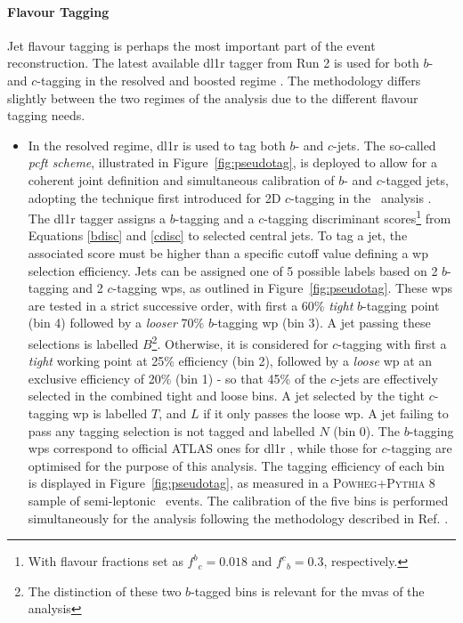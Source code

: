 \paragraph{Flavour Tagging} Jet flavour tagging is perhaps the most important part of the event reconstruction. The latest available \gls{dl1r} tagger from Run 2 is used for both $b$- and $c$-tagging in the resolved and boosted regime \cite{atlas:FTAGRUN2}. The methodology differs slightly between the two regimes of the analysis due to the different flavour tagging needs.
\begin{itemize}[leftmargin=*]
\item In the resolved regime, \gls{dl1r} is used to tag both $b$- and $c$-jets. The so-called \textit{ \gls{pcft} scheme}, illustrated in Figure~\ref{fig:pseudotag}, is deployed to allow for a coherent joint definition and simultaneous calibration of $b$- and $c$-tagged jets, adopting the technique first introduced for 2D $c$-tagging in the \vhc\ analysis \cite{Collaboration:2721696}. The \gls{dl1r} tagger assigns a $b$-tagging and a $c$-tagging discriminant scores\footnote{With flavour fractions set as ${f^b}_c = 0.018$ and ${f^c}_b = 0.3$, respectively.} from Equations \ref{bdisc} and \ref{cdisc} to selected central jets. To tag a jet, the associated score must be higher than a specific cutoff value defining a \gls{wp} selection efficiency. Jets can be assigned one of 5 possible labels based on 2 $b$-tagging and 2 $c$-tagging \glspl{wp}, as outlined in Figure~\ref{fig:pseudotag}. These \glspl{wp} are tested in a strict successive order, with first a 60\% \textit{tight} $b$-tagging point (bin 4) followed by a \textit{looser} 70\% $b$-tagging \gls{wp} (bin 3). A jet passing these selections is labelled $B$\footnote{The distinction of these two $b$-tagged bins is relevant for the \glspl{mva} of the analysis}. Otherwise, it is considered for $c$-tagging with first a \textit{tight} working point at 25\% efficiency (bin 2), followed by a \textit{loose} \gls{wp} at an exclusive efficiency of 20\% (bin 1) - so that 45\% of the $c$-jets are effectively selected in the combined tight and loose bins. A jet selected by the tight $c$-tagging \gls{wp} is labelled $T$, and $L$ if it only passes the loose \gls{wp}. A jet failing to pass any tagging selection is not tagged and labelled $N$ (bin 0). The $b$-tagging \glspl{wp} correspond to official ATLAS ones for \gls{dl1r} \cite{atlas:FTAGRUN2}, while those for $c$-tagging are optimised for the purpose of this analysis. The tagging efficiency of each bin is displayed in Figure~\ref{fig:pseudotag}, as measured in a \textsc{Powheg}+\textsc{Pythia} 8 sample of semi-leptonic \ttb\ events. The calibration of the five bins is performed simultaneously for the analysis following the methodology described in Ref. \cite{atlas:FTAGRUN2}.%


\end{itemize}
